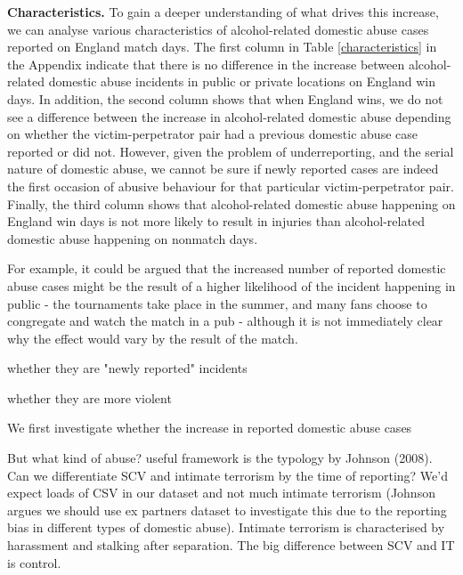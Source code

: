\documentclass[12pt, letterpaper]{article}
\begin{document}
\textbf{Characteristics.} To gain a deeper understanding of what drives this increase, we can analyse various characteristics of alcohol-related domestic abuse cases reported on England match days.  The first column in Table \ref{characteristics} in the Appendix indicate that there is no difference in the increase between alcohol-related domestic abuse incidents in public or private locations on England win days. In addition, the second column shows that when England wins, we do not see a difference between the increase in alcohol-related domestic abuse depending on whether the victim-perpetrator pair had a previous domestic abuse case reported or did not. However, given the problem of underreporting, and the serial nature of domestic abuse, we cannot be sure if newly reported cases are indeed the first occasion of abusive behaviour for that particular victim-perpetrator pair. Finally, the third column shows that alcohol-related domestic abuse happening on England win days is not more likely to result in injuries than alcohol-related domestic abuse happening on nonmatch days.   


For example, it could be argued that the increased number of reported domestic abuse cases might be the result of a higher likelihood of the incident happening in public - the tournaments take place in the summer, and many fans choose to congregate and watch the match in a pub - although it is not immediately clear why the effect would vary by the result of the match. 

whether they are "newly reported" incidents

whether they are more violent

We first investigate whether the increase in reported domestic abuse cases





But what kind of abuse? useful framework is the typology by Johnson (2008). Can we differentiate SCV and intimate terrorism by the time of reporting? We'd expect loads of CSV in our dataset and not much intimate terrorism (Johnson argues we should use ex partners dataset to investigate this due to the reporting bias in different types of domestic abuse). Intimate terrorism is characterised by harassment and stalking after separation. The big difference between SCV and IT is control. 


\end{document}
